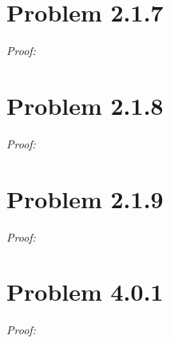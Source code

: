 \documentclass[11pt]{article}
\theoremstyle{definition}
\theoremstyle{remark}
\theoremstyle{problem}
\begin{document}
\section{Problem 2.1.7}
\textit{Proof:}
\newpage

\section{Problem 2.1.8}
\textit{Proof:}
\newpage

\section{Problem 2.1.9}
\textit{Proof:}
\newpage

\section{Problem 4.0.1}
\textit{Proof:}
\end{document}
